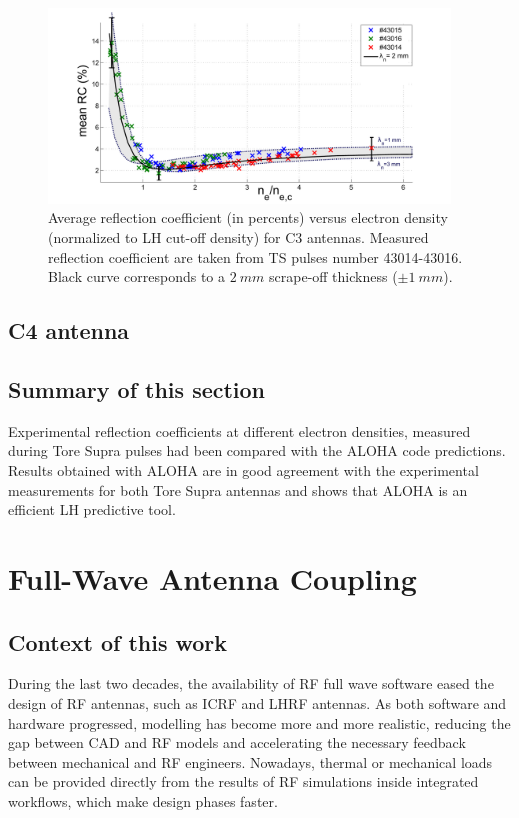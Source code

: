 \begin{figure}[h]
	\centering
	\includegraphics[width=0.95\textwidth]{figures/chap2/Tore_Supra/C3_mean_lowerMod}
	\caption{Average reflection  coefficient (in percents) versus electron density (normalized to LH cut-off density) for C3 antennas. Measured reflection  coefficient are taken from TS pulses number 43014-43016. Black curve corresponds to a $2~mm$ scrape-off thickness ($\pm 1~mm$).}
	\label{fig:MarkII_mean_RC}
\end{figure}




\subsection{C4 antenna}

\subsection{Summary of this section}

Experimental reflection coefficients at different electron densities, measured during Tore Supra pulses had been compared with the ALOHA code predictions. Results obtained with ALOHA are in good agreement with the experimental measurements for both Tore Supra antennas and shows that ALOHA is an efficient LH predictive tool. 

\section{Full-Wave Antenna Coupling}\label{sec:LHCD_FW_antena_coupling}
\subsection{Context of this work}
During the last two decades, the availability of RF full wave software eased the design of RF antennas, such as ICRF and LHRF antennas. As both software and hardware progressed, modelling has become more and more realistic, reducing the gap between CAD and RF models and accelerating the necessary feedback between mechanical and RF engineers. Nowadays, thermal or mechanical loads can be provided directly from the results of RF simulations inside integrated workflows, which make design phases faster.

